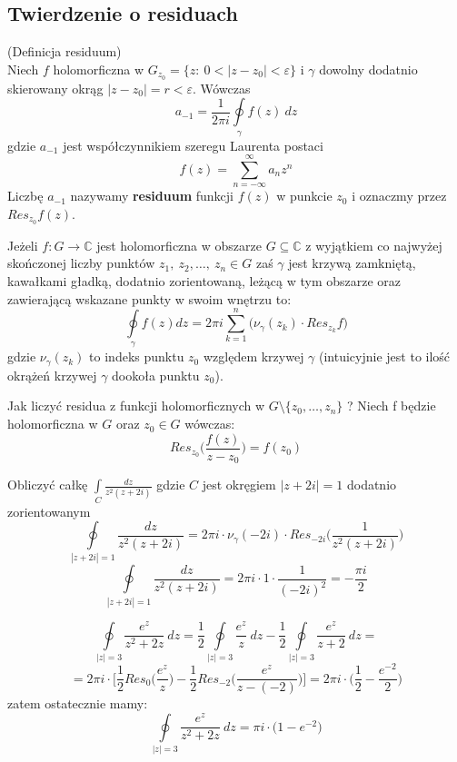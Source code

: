 \subsection{Twierdzenie o residuach}

\begin{df}{(Definicja residuum)}\\
Niech $f$ holomorficzna w $G_{z_0}=\lbrace z:\ 0<|z-z_0|<\varepsilon\rbrace$ i $\gamma$ dowolny dodatnio skierowany okrąg $|z-z_0|=r<\varepsilon$. Wówczas $$a_{-1}=\frac{1}{2\pi i} \oint\limits_{\gamma} f(z)\ dz$$ gdzie $a_{-1}$ jest współczynnikiem szeregu Laurenta postaci $$f(z)=\sum_{n=-\infty}^{\infty} a_n z^n$$ Liczbę $a_{-1}$ nazywamy \textbf{residuum} funkcji $f(z)$ w punkcie $z_0$ i oznaczmy przez $Res_{z_0} f(z)$. 
\end{df}

\begin{tw}
Jeżeli $f:G\rightarrow\mathbb{C}$ jest holomorficzna w obszarze $G\subseteq \mathbb{C}$ z wyjątkiem co najwyżej sko{\'n}czonej liczby punktów $z_1,\ z_2, \ldots,\ z_n \in G$ zaś $\gamma$ jest krzywą zamkniętą, kawałkami gładką, dodatnio zorientowaną, leżącą w tym obszarze oraz zawierającą wskazane punkty w swoim wnętrzu to:
$$\oint\limits_{\gamma}f(z)dz=2\pi i \sum_{k=1}^{n}\bigg(\nu_{\gamma}(z_k)\cdot Res_{z_k}f \bigg)$$ gdzie $\nu_{\gamma}(z_k)$ to indeks punktu $z_0$ względem krzywej $\gamma$ (intuicyjnie jest to ilość okrążeń krzywej $\gamma$ dookoła punktu $z_0$).
\end{tw}

\begin{tw}{Jak liczyć residua z funkcji holomorficznych w $G\setminus\lbrace z_0,\ldots, z_n\rbrace$ ?}
Niech f będzie holomorficzna w $G$ oraz $z_0\in G$ wówczas: $$Res_{z_0}\bigg(\dfrac{f(z)}{z-z_0}\bigg)=f(z_0)$$
\end{tw}

\begin{przyk}
Obliczyć całkę $\int\limits_{C} \frac{dz}{z^2(z+2i)}$ gdzie $C$ jest okręgiem $|z+2i|=1$ dodatnio zorientowanym $$\oint\limits_{|z+2i|=1}\frac{dz}{z^2(z+2i)}=2\pi i \cdot \nu_{\gamma}(-2i)\cdot Res_{-2i}\bigg( \frac{1}{z^2(z+2i)}\bigg)$$ $$\oint\limits_{|z+2i|=1}\frac{dz}{z^2(z+2i)}=2\pi i \cdot 1 \cdot \frac{1}{(-2i)^2}=-\frac{\pi i}{2}$$
\end{przyk}

\begin{przyk}
$$\oint\limits_{|z|=3}\frac{e^z}{z^2+2z}\ dz=\frac{1}{2}\oint\limits_{|z|=3}\frac{e^z}{z}\ dz-\frac{1}{2}\oint\limits_{|z|=3}\frac{e^z}{z+2}\ dz=$$ $$=2\pi i \cdot \bigg[\frac{1}{2} Res_0 \bigg(\frac{e^z}{z}\bigg)-\frac{1}{2} Res_{-2} \bigg(\frac{e^z}{z-(-2)}\bigg)\bigg]=2\pi i \cdot \bigg(\frac{1}{2}-\frac{e^{-2}}{2}\bigg)$$ zatem ostatecznie mamy: $$\oint\limits_{|z|=3}\frac{e^z}{z^2+2z}\ dz=\pi i \cdot \big(1-e^{-2}\big)$$
\end{przyk}

